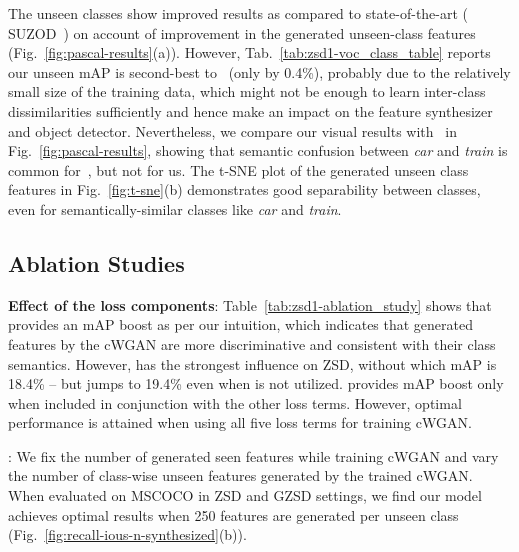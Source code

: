 \documentclass{bmvc2k}
\begin{document}
 The unseen classes show improved results as compared to state-of-the-art ( SUZOD~\cite{hayat2020synthesizing}) on account of improvement in the generated unseen-class features (Fig.~\ref{fig:pascal-results}(a)). However, Tab.~\ref{tab:zsd1-voc_class_table} reports our unseen mAP is second-best to~\cite{hayat2020synthesizing} (only by 0.4\%), probably due to the relatively small size of the training data, which might not be enough to learn inter-class dissimilarities sufficiently and hence make an impact on the feature synthesizer and object detector. Nevertheless, we compare our visual results with~\cite{hayat2020synthesizing} in Fig.~\ref{fig:pascal-results}, showing that semantic confusion between {\em car} and {\em train} is common for~\cite{hayat2020synthesizing}, but not for us. The t-SNE plot of the generated unseen class features in Fig.~\ref{fig:t-sne}(b) demonstrates good separability between classes, even for semantically-similar classes like {\em car} and {\em train}. 



\subsection{Ablation Studies} 
\label{sec:ablation}
\textbf{Effect of the loss components}: Table~\ref{tab:zsd1-ablation_study} shows that  provides an mAP boost as per our intuition, which indicates that generated features by the cWGAN are more discriminative and consistent with their class semantics. However,  has the strongest influence on ZSD, without which mAP is 18.4\% -- but jumps to 19.4\% even when  is not utilized.  provides mAP boost only when included in conjunction with the other loss terms. However, optimal performance is attained when using all five loss terms for training cWGAN.  



: We fix the number of generated seen features while training cWGAN and vary the number of class-wise unseen features generated by the trained cWGAN. When evaluated on MSCOCO in ZSD and GZSD settings, we find our model achieves optimal results when 250 features are generated per unseen class (Fig.~\ref{fig:recall-ious-n-synthesized}(b)). 
\end{document}

